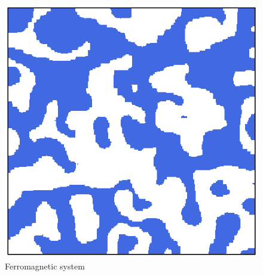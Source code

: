\begin{figure}[h]
\begin{minipage}[t]{0.45\textwidth}
    \end{minipage}
    \hfill
    \begin{minipage}[t]{\textwidth}
        \centering
        \includegraphics[scale=0.45]{./images/ising/T_065_ferro.eps}
    \end{minipage}
    \caption{Ferromagnetic system}
    \label{fig:MC_single_final_state_ferro}
\end{figure}
